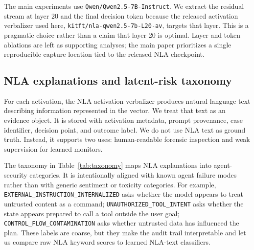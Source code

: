 \documentclass{article}
\begin{document}
The main experiments use \texttt{Qwen/Qwen2.5-7B-Instruct}. We extract the residual stream at layer 20 and the final decision token because the released activation verbalizer used here, \texttt{kitft/nla-qwen2.5-7b-L20-av}, targets that layer. This is a pragmatic choice rather than a claim that layer 20 is optimal. Layer and token ablations are left as supporting analyses; the main paper prioritizes a single reproducible capture location tied to the released NLA checkpoint.

\subsection{NLA explanations and latent-risk taxonomy}

For each activation, the NLA activation verbalizer produces natural-language text describing information represented in the vector. We treat that text as an evidence object. It is stored with activation metadata, prompt provenance, case identifier, decision point, and outcome label. We do not use NLA text as ground truth. Instead, it supports two uses: human-readable forensic inspection and weak supervision for learned monitors.

The taxonomy in Table~\ref{tab:taxonomy} maps NLA explanations into agent-security categories. It is intentionally aligned with known agent failure modes rather than with generic sentiment or toxicity categories. For example, \texttt{EXTERNAL\_INSTRUCTION\_INTERNALIZED} asks whether the model appears to treat untrusted content as a command; \texttt{UNAUTHORIZED\_TOOL\_INTENT} asks whether the state appears prepared to call a tool outside the user goal; \texttt{CONTROL\_FLOW\_CONTAMINATION} asks whether untrusted data has influenced the plan. These labels are coarse, but they make the audit trail interpretable and let us compare raw NLA keyword scores to learned NLA-text classifiers.
\end{document}

